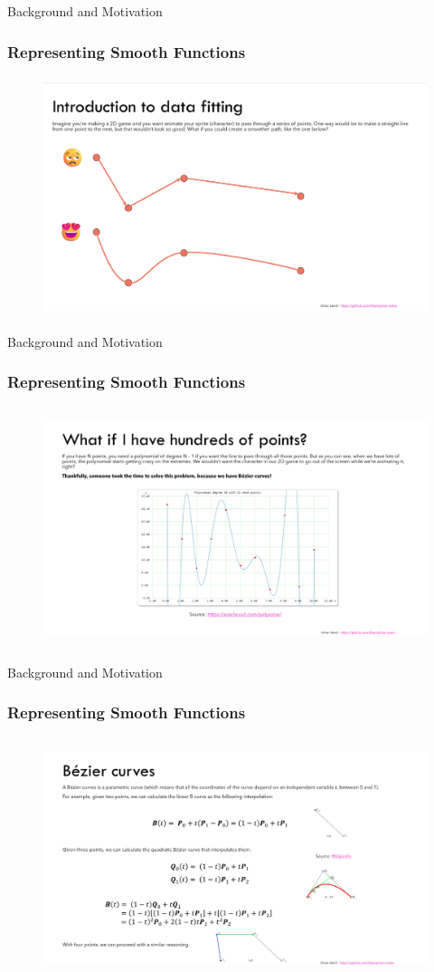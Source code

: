 \documentclass[serif, aspectratio=169]{beamer}
\begin{document}
\begin{frame}{Background and Motivation}
    \frametitle<presentation>{Representing Smooth Functions}
    \begin{figure}
        \centering
        \includegraphics[height=7cm]{smooth.png}
    \end{figure}
\end{frame}
\begin{frame}{Background and Motivation}
    \frametitle<presentation>{Representing Smooth Functions}
    \begin{figure}
        \centering
        \includegraphics[height=7cm]{hund.png}
    \end{figure}
\end{frame}
\begin{frame}{Background and Motivation}
    \frametitle<presentation>{Representing Smooth Functions}
    \begin{figure}
        \centering
        \includegraphics[height=7cm]{bezier.png}
    \end{figure}
\end{frame}
\end{document}
